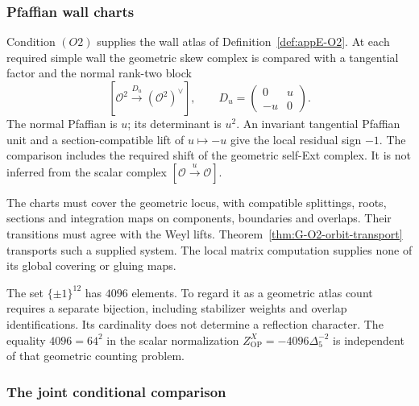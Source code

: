 \subsubsection*{Pfaffian wall charts}

Condition \((O2)\) supplies the wall atlas of
Definition~\ref{def:appE-O2}. At each required simple wall the
geometric skew complex is compared with a tangential factor and the
normal rank-two block
\[
 [\mathcal O^2\xrightarrow{D_u}(\mathcal O^2)^\vee],
 \qquad D_u=\begin{pmatrix}0&u\\-u&0\end{pmatrix}.
\]
The normal Pfaffian is \(u\); its determinant is \(u^2\).
An invariant tangential Pfaffian unit and a section-compatible lift
of \(u\mapsto-u\) give the local residual sign \(-1\).
The comparison includes the required shift of the geometric
self-Ext complex. It is not inferred from the scalar complex
\([\mathcal O\xrightarrow{u}\mathcal O]\).

The charts must cover the geometric locus, with compatible
splittings, roots, sections and integration maps on components,
boundaries and overlaps. Their transitions must agree with the
Weyl lifts. Theorem~\ref{thm:G-O2-orbit-transport} transports such a
supplied system. The local matrix computation supplies none of its
global covering or gluing maps.

The set \(\{\pm1\}^{12}\) has \(4096\) elements. To regard it as
a geometric atlas count requires a separate bijection, including
stabilizer weights and overlap identifications. Its cardinality does
not determine a reflection character. The equality \(4096=64^2\)
in the scalar normalization
\(Z^X_{\mathrm{OP}}=-4096\Delta_5^{-2}\) is independent of that
geometric counting problem.

\subsubsection*{The joint conditional comparison}

